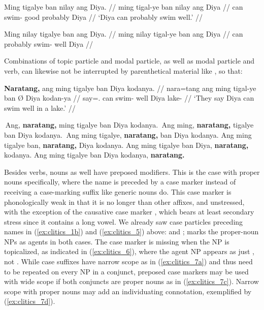\pex\label{ex:clitics_5}
\a\label{ex:clitics_5a}\begingl
	\gla Ming tigalye ban nilay ang Diya. //
	\glb ming tigal-ye ban nilay ang Diya //
	\glc can swim-\TsgF{} good probably \Aarg{} Diya //
	\glft `Diya can probably swim well.' //
\endgl

\a\label{ex:clitics_5b}\ljudge{*}\begingl
	\gla Ming nilay tigalye ban ang Diya. //
	\glb ming nilay tigal-ye ban ang Diya //
	\glc can probably swim-\TsgF{} well \Aarg{} Diya //
\endgl
\xe

Combinations of topic particle and modal particle, as well as modal particle
and verb, can likewise not be interrupted by parenthetical material like
, so that:

\pex\label{ex:clitics_6}
\a\label{ex:clitics_6a}\begingl
	\gla \textbf{Naratang,} ang ming tigalye ban {} Diya kodanya. //
	\glb nara=tang ang ming tigal-ye ban Ø Diya kodan-ya //
	\glc say=\TplM{}.\Aarg{} \AgtT{} can swim-\TsgF{} well \Top{} Diya 
		lake-\Loc{}	//
	\glft `They say Diya can swim well in a lake.' //
\endgl

\a \ljudge{*} Ang, \textbf{naratang,} ming tigalye ban Diya kodanya.
\a \ljudge{*} Ang ming, \textbf{naratang,} tigalye ban Diya kodanya.
\a {} Ang ming tigalye, \textbf{naratang,} ban Diya kodanya.
\a Ang ming tigalye ban, \textbf{naratang,} Diya kodanya.
\a Ang ming tigalye ban Diya, \textbf{naratang,} kodanya.
\a Ang ming tigalye ban Diya kodanya, \textbf{naratang.}

\xe

Besides verbs, nouns as well have preposed modifiers. This is the case with
proper nouns specifically, where the name is preceded by a case marker instead
of receiving a case-marking suffix like generic nouns do. This case marker is
phonologically weak in that it is no longer than other affixes, and unstressed,
with the exception of the causative case marker , which bears
at least secondary stress since it contains a long vowel. We already saw case
particles preceding names in (\ref{ex:clitics_1b}) and (\ref{ex:clitics_5})
above:  and ; 
 marks the proper-noun NPs as agents in both cases. The case
marker is missing when the NP is topicalized, as indicated in 
(\ref{ex:clitics_6}), where the agent NP appears as just ,
not . While case suffixes have narrow scope as in 
(\ref{ex:clitics_7a}) and thus need to be repeated on every NP in a conjunct,
preposed case markers may be used with wide scope if both conjuncts are proper
nouns as in (\ref{ex:clitics_7c}). Narrow scope with proper nouns may add an
individuating connotation, exemplified by (\ref{ex:clitics_7d}).

